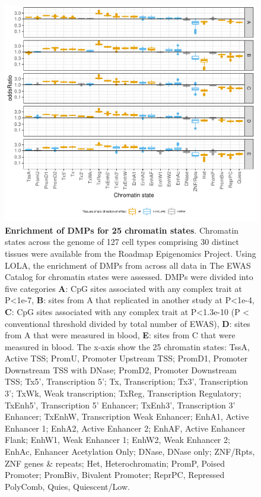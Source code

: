 \documentclass[11pt,oneside]{bristolthesis}
\begin{document}
\begin{figure}

{\centering \includegraphics[width=1\linewidth]{figure/04-properties_of_ewas/chromatin_states_enrichment_boxplots_onepage} 

}

\caption[Enrichment of DMPs for 25 chromatin states]{\textbf{Enrichment of DMPs for 25 chromatin states}. Chromatin states across the genome of 127 cell types comprising 30 distinct tissues were available from the Roadmap Epigenomics Project. Using LOLA, the enrichment of DMPs from across all data in The EWAS Catalog for chromatin states were assessed. DMPs were divided into five categories \textbf{A}: CpG sites associated with any complex trait at P\textless1e-7, \textbf{B}: sites from A that replicated in another study at P\textless1e-4, \textbf{C}: CpG sites associated with any complex trait at P\textless1.3e-10 (P \textless{} conventional threshold divided by total number of EWAS), \textbf{D}: sites from A that were measured in blood, \textbf{E}: sites from C that were measured in blood. The x-axis show the 25 chromatin states: TssA, Active TSS; PromU, Promoter Upstream TSS; PromD1, Promoter Downstream TSS with DNase; PromD2, Promoter Downstream TSS; Tx5', Transcription 5'; Tx, Transcription; Tx3', Transcription 3'; TxWk, Weak transcription; TxReg, Transcription Regulatory; TxEnh5', Transcription 5' Enhancer; TxEnh3', Transcription 3' Enhancer; TxEnhW, Transcription Weak Enhancer; EnhA1, Active Enhancer 1; EnhA2, Active Enhancer 2; EnhAF, Active Enhancer Flank; EnhW1, Weak Enhancer 1; EnhW2, Weak Enhancer 2; EnhAc, Enhancer Acetylation Only; DNase, DNase only; ZNF/Rpts, ZNF genes \& repeats; Het, Heterochromatin; PromP, Poised Promoter; PromBiv, Bivalent Promoter; ReprPC, Repressed PolyComb, Quies, Quiescent/Low.}\label{fig:chrom-state-plot}
\end{figure}
\end{document}
